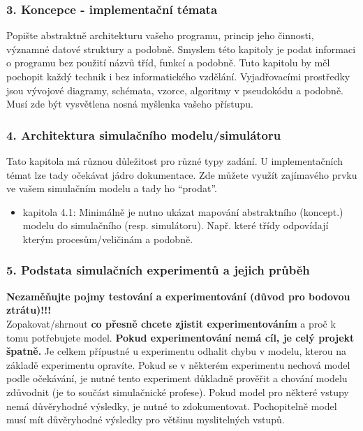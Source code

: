 \documentclass{article}
\begin{document}
\subsubsection{3. Koncepce - implementační
témata}\label{koncepce---implementaux10dnuxed-tuxe9mata}

Popište abstraktně architekturu vašeho programu, princip jeho činnosti,
významné datové struktury a podobně. Smyslem této kapitoly je podat
informaci o programu bez použití názvů tříd, funkcí a podobně. Tuto
kapitolu by měl pochopit každý technik i bez informatického vzdělání.
Vyjadřovacími prostředky jsou vývojové diagramy, schémata, vzorce,
algoritmy v pseudokódu a podobně. Musí zde být vysvětlena nosná myšlenka
vašeho přístupu.\\[3\baselineskip]

\subsubsection{4. Architektura simulačního
modelu/simulátoru}\label{architektura-simulaux10dnuxedho-modelusimuluxe1toru}

Tato kapitola má různou důležitost pro různé typy zadání. U
implementačních témat lze tady očekávat jádro dokumentace. Zde můžete
využít zajímavého prvku ve vašem simulačním modelu a tady ho
``prodat''.\\

\begin{itemize}
\tightlist
\item
  kapitola 4.1: Minimálně je nutno ukázat mapování abstraktního
  (koncept.) modelu do simulačního (resp. simulátoru). Např. které třídy
  odpovídají kterým procesům/veličinám a podobně.
\end{itemize}

\subsubsection{5. Podstata simulačních experimentů a jejich
průběh}\label{podstata-simulaux10dnuxedch-experimentux16f-a-jejich-prux16fbux11bh}

\textbf{Nezaměňujte pojmy testování a experimentování (důvod pro bodovou
ztrátu)!!!}\\
Zopakovat/shrnout \textbf{co přesně chcete zjistit experimentováním} a
proč k tomu potřebujete model. \textbf{Pokud experimentování nemá cíl,
je celý projekt špatně.} Je celkem přípustné u experimentu odhalit chybu
v modelu, kterou na základě experimentu opravíte. Pokud se v některém
experimentu nechová model podle očekávání, je nutné tento experiment
důkladně prověřit a chování modelu zdůvodnit (je to součást simulačnické
profese). Pokud model pro některé vstupy nemá důvěryhodné výsledky, je
nutné to zdokumentovat. Pochopitelně model musí mít důvěryhodné výsledky
pro většinu myslitelných vstupů.\\
\end{document}
